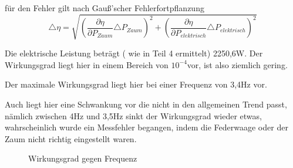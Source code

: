 für den Fehler gilt nach Gauß'scher Fehlerfortpflanzung
\[
\triangle\eta=\sqrt{\left(\frac{\partial\eta}{\partial P_{Zaum}}\triangle P_{Zaum}\right)^{2}+\left(\frac{\partial\eta}{\partial P_{elektrisch}}\triangle P_{elektrisch}\right)^{2}}
\]


Die elektrische Leistung beträgt ( wie in Teil 4 ermittelt) 2250,6W.
Der Wirkungsgrad liegt hier in einem Bereich von $10^{-4}$vor, ist
also ziemlich gering.

Der maximale Wirkungsgrad liegt hier bei einer Frequenz von 3,4Hz
vor.

Auch liegt hier eine Schwankung vor die nicht in den allgemeinen Trend
passt, nämlich zwischen 4Hz und 3,5Hz sinkt der Wirkungsgrad wieder
etwas, wahrscheinlich wurde ein Messfehler begangen, indem die Federwaage
oder der Zaum nicht richtig eingestellt waren.

\begin{figure}
\protect\caption{Wirkungsgrad gegen Frequenz}
\end{figure}
